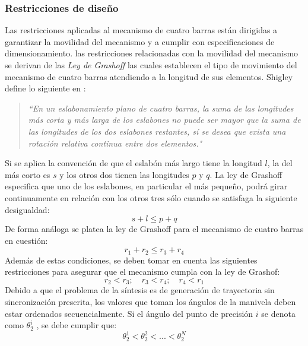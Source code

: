 \subsubsection{Restricciones de diseño}\label{sec:Restricciones de diseño MEC}
Las restricciones aplicadas al mecanismo de cuatro barras están dirigidas a garantizar la movilidad del mecanismo y a cumplir con especificaciones de dimensionamiento. las restricciones relacionadas con la movilidad del mecanismo se derivan de las \textit{Ley de Grashoff} las cuales establecen el tipo de movimiento del mecanismo de cuatro barras atendiendo a la longitud de sus elementos. Shigley define lo siguiente en \cite{shigley1983teoria}:
\begin{quote}
\textit{``{En un eslabonamiento plano de cuatro barras, la suma de las longitudes más corta y más larga de los eslabones no puede ser mayor que la suma de las longitudes de los dos eslabones restantes, sí se desea que exista una rotación relativa continua entre dos elementos}."} 
\end{quote}
Si se aplica la convención de que el eslabón más largo tiene la longitud $l$, la del más corto es $s$ y los otros dos tienen las longitudes $p$ y $q$. La ley de Grashoff especifica que uno de los eslabones, en particular el más pequeño, podrá girar continuamente en relación con los otros tres sólo cuando se satisfaga la siguiente desigualdad:
\begin{equation}
s+l \leq p+q
\end{equation}
De forma análoga se platea la ley de Grashoff para el mecanismo de cuatro barras en cuestión:
\begin{equation}
r_1+r_2 \leq r_3+r_4
\end{equation}
Además de estas condiciones, se deben tomar en cuenta las siguientes restricciones  para asegurar que el mecanismo cumpla con la ley de Grashof:
\begin{equation}
r_2 < r_3;\quad r_3 < r_4;\quad r_4 < r_1 
\end{equation}
Debido a que el problema de la síntesis es de generación de trayectoria sin sincronización prescrita, los valores que toman los ángulos de la manivela deben estar ordenados secuencialmente. Si el ángulo
del punto de precisión $i$ se denota como $\theta^i_2$ , se debe cumplir que:
\begin{equation}
\theta^1_2 < \theta^2_2< ... < \theta^N_2
\end{equation}
